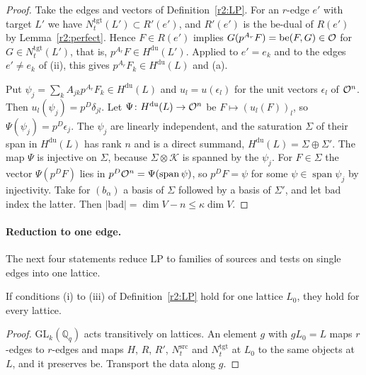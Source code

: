 \begin{proof}
Take the edges and vectors of Definition~\ref{r2:LP}. For an $r$-edge $e'$ with target $L'$ we have $N^{\mathrm{tgt}}_t(L')\subset R'(e')$, and $R'(e')$ is the $\mathrm{be}$-dual of $R(e')$ by Lemma~\ref{r2:perfect}. Hence $F\in R(e')$ implies $G(p^{A_r}F)=\mathrm{be}(F,G)\in\mathcal O$ for $G\in N^{\mathrm{tgt}}_t(L')$, that is, $p^{A_r}F\in H^{\mathrm{du}}(L')$. Applied to $e'=e_k$ and to the edges $e'\ne e_k$ of (ii), this gives $p^{A_r}F_k\in H^{\mathrm{du}}(L)$ and (a).

Put $\psi_j=\sum_kA_{jk}p^{A_r}F_k\in H^{\mathrm{du}}(L)$ and $u_l=u(\epsilon_l)$ for the unit vectors $\epsilon_l$ of $\mathcal O^n$. Then $u_l(\psi_j)=p^D\delta_{jl}$. Let $\Psi\colon H^{\mathrm{du}}(L)\to\mathcal O^n$ be $F\mapsto(u_l(F))_l$, so $\Psi(\psi_j)=p^D\epsilon_j$. The $\psi_j$ are linearly independent, and the saturation $\Sigma$ of their span in $H^{\mathrm{du}}(L)$ has rank $n$ and is a direct summand, $H^{\mathrm{du}}(L)=\Sigma\oplus\Sigma'$. The map $\Psi$ is injective on $\Sigma$, because $\Sigma\otimes\mathcal K$ is spanned by the $\psi_j$. For $F\in\Sigma$ the vector $\Psi(p^DF)$ lies in $p^D\mathcal O^n=\Psi(\operatorname{span}\psi)$, so $p^DF=\psi$ for some $\psi\in\operatorname{span}\psi_j$ by injectivity. Take for $(b_\alpha)$ a basis of $\Sigma$ followed by a basis of $\Sigma'$, and let $\mathrm{bad}$ index the latter. Then $\lvert\mathrm{bad}\rvert=\dim V-n\le\kappa\dim V$.
\end{proof}

\paragraph{Reduction to one edge.} The next four statements reduce $\mathrm{LP}$ to families of sources and tests on single edges into one lattice.

\begin{lemma}\label{r2:onelattice}
If conditions (i) to (iii) of Definition~\ref{r2:LP} hold for one lattice $L_0$, they hold for every lattice.
\end{lemma}

\begin{proof}
$\mathrm{GL}_k(\mathbb Q_q)$ acts transitively on lattices. An element $g$ with $gL_0=L$ maps $r$-edges to $r$-edges and maps $H$, $R$, $R'$, $N^{\mathrm{src}}_t$ and $N^{\mathrm{tgt}}_t$ at $L_0$ to the same objects at $L$, and it preserves $\mathrm{be}$. Transport the data along $g$.
\end{proof}

